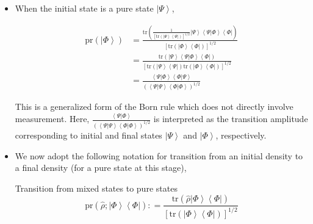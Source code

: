 \documentclass[9pt,handout]{beamer}
\newcommand{\pr}[0]{\text{pr}}
\newcommand{\tr}[0]{\text{tr}}
\begin{document}
\begin{frame}{}
\begin{itemize}
\item When the initial state is a pure state $\left\lvert \Psi \right\rangle$,

\begin{align*}
\pr \left( \left\lvert \Phi \right\rangle \right) & = \frac{\tr \left( \frac{1}{\left[ \tr \left( \left\lvert \Psi \right\rangle \left\langle \Psi \right\rvert \right) \right]^{1/2}} \left\lvert \Psi \right\rangle \left\langle \Psi \right\rvert \left. \Phi \right\rangle \left\langle \Phi \right\rvert \right)}{\left[ \tr \left( \left\lvert \Phi \right\rangle \left\langle \Phi \right\rvert \right) \right]^{1/2}} \\
& = \frac{\tr \left( \left\lvert \Psi \right\rangle \left\langle \Psi \right\rvert \left. \Phi \right\rangle \left\langle \Phi \right\rvert \right)}{\left[ \tr \left( \left\lvert \Psi \right\rangle \left\langle \Psi \right\rvert \right) \tr \left( \left\lvert \Phi \right\rangle \left\langle \Phi \right\rvert \right) \right]^{1/2}} \\
& = \frac{\left\langle \Psi \right\rvert \left. \Phi \right\rangle \left\langle \Phi \right\rvert \left. \Psi \right\rangle}{\left( \left\langle \Psi \right\rvert \left. \Psi \right\rangle \left\langle \Phi \right\rvert \left. \Phi \right\rangle \right)^{1/2}}
\end{align*}

This is a generalized form of the Born rule which does not directly involve measurement. Here, $\displaystyle{\frac{\left\langle \Psi \right\rvert \left. \Phi \right\rangle}{\left( \left\langle \Psi \right\rvert \left. \Psi \right\rangle \left\langle \Phi \right\rvert \left. \Phi \right\rangle \right)^{1/2}}}$ is interpreted as the transition amplitude corresponding to initial and final states $\left\lvert \Psi \right\rangle$ and $\left\lvert \Phi \right\rangle$, respectively.

\item We now adopt the following notation for transition from an initial density to a final density (for a pure state at this stage),

\begin{block}{Transition from mixed states to pure states}
$$\pr \left( \widehat{\rho}; \left\lvert \Phi \right\rangle \left\langle \Phi \right\rvert \right) : = \frac{\tr \left( \widehat{\rho} \left\lvert \Phi \right\rangle \left\langle \Phi \right\rvert \right)}{\left[ \tr \left( \left\lvert \Phi \right\rangle \left\langle \Phi \right\rvert \right) \right]^{1/2}}$$
\end{block}
\end{itemize}
\end{frame}
\end{document}

